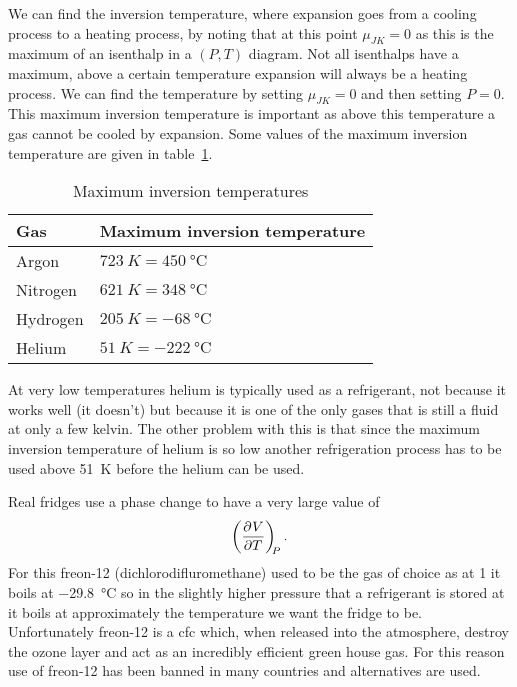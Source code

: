 \documentclass[a4paper]{article}
\begin{document}
    We can find the inversion temperature, where expansion goes from a cooling process to a heating process, by noting that at this point \(\mu_{JK} = 0\) as this is the maximum of an isenthalp in a \((P, T)\) diagram.
    Not all isenthalps have a maximum, above a certain temperature expansion will always be a heating process.
    We can find the temperature by setting \(\mu_{JK} = 0\) and then setting \(P = 0\).
    This maximum inversion temperature is important as above this temperature a gas cannot be cooled by expansion.
    Some values of the maximum inversion temperature are given in table~\ref{tab:maximum inversion temperatures}.
    \begin{table}[ht]
        \centering
        \begin{tabular}{ll}\hline
            Gas & Maximum inversion temperature\\\hline
            Argon & \(\SI{723}{K} = \SI{450}{\degreeCelsius}\)\\
            Nitrogen & \(\SI{621}{K} = \SI{348}{\degreeCelsius}\)\\
            Hydrogen & \(\SI{205}{K} = \SI{-68}{\degreeCelsius}\)\\
            Helium & \(\SI{51}{K} = \SI{-222}{\degreeCelsius}\)\\\hline
        \end{tabular}
        \caption{Maximum inversion temperatures}
        \label{tab:maximum inversion temperatures}
    \end{table}
    At very low temperatures helium is typically used as a refrigerant, not because it works well (it doesn't) but because it is one of the only gases that is still a fluid at only a few kelvin.
    The other problem with this is that since the maximum inversion temperature of helium is so low another refrigeration process has to be used above \SI{51}{\kelvin} before the helium can be used.
    
    Real fridges use a phase change to have a very large value of
    \[\left(\pdv[]{V}{T}\right)_{\!\!{P}}.\]
    For this freon-12 (dichlorodifluromethane) used to be the gas of choice as at \SI{1}{\atm} it boils at \SI{-29.8}{\degreeCelsius} so in the slightly higher pressure that a refrigerant is stored at it boils at approximately the temperature we want the fridge to be.
    Unfortunately freon-12 is a \gls{cfc} which, when released into the atmosphere, destroy the ozone layer and act as an incredibly efficient green house gas.
    For this reason use of freon-12 has been banned in many countries and alternatives are used.
    
\end{document}
